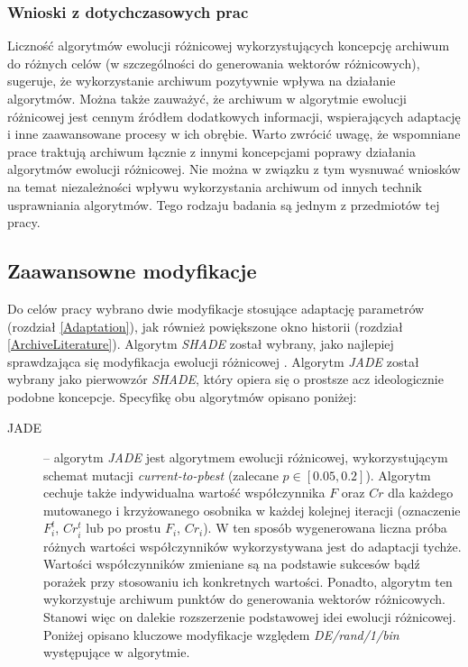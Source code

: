 \documentclass[12pt,a4paper]{report}
\begin{document}
{{{\subsubsection{Wnioski z dotychczasowych prac}
\par{
Liczność algorytmów ewolucji różnicowej wykorzystujących koncepcję archiwum do różnych celów (w szczególności do generowania wektorów różnicowych), sugeruje, że wykorzystanie archiwum pozytywnie wpływa na działanie algorytmów. Można także zauważyć, że archiwum w algorytmie ewolucji różnicowej jest cennym źródłem dodatkowych informacji, wspierających adaptację i inne zaawansowane procesy w ich obrębie. Warto zwrócić uwagę, że wspomniane prace traktują archiwum łącznie z innymi koncepcjami poprawy działania algorytmów ewolucji różnicowej. Nie można w związku z tym wysnuwać wniosków na temat niezależności wpływu wykorzystania archiwum od innych technik usprawniania algorytmów. Tego rodzaju badania są jednym z przedmiotów tej pracy.
}

\subsection{Zaawansowne modyfikacje}
\label{AdvancedDE}
\par{
Do celów pracy wybrano dwie modyfikacje stosujące adaptację parametrów (rozdział \ref{Adaptation}), jak również powiększone okno historii (rozdział \ref{ArchiveLiterature}). Algorytm \emph{SHADE} \cite{SHADE} został wybrany, jako najlepiej sprawdzająca się modyfikacja ewolucji różnicowej \cite{CEC2013Comp}. Algorytm \emph{JADE} \cite{JADE} został wybrany jako pierwowzór \emph{SHADE}, który opiera się o prostsze acz ideologicznie podobne koncepcje. Specyfikę obu algorytmów opisano poniżej:
}
\begin{description}
\item[JADE] \cite{JADE} -- algorytm \emph{JADE} jest algorytmem ewolucji różnicowej, wykorzystującym schemat mutacji \emph{current-to-pbest} (zalecane $p \in [0.05, 0.2]$). Algorytm cechuje także indywidualna wartość współczynnika $F$ oraz $Cr$ dla każdego mutowanego i krzyżowanego osobnika w każdej kolejnej iteracji (oznaczenie $F_i^t$, $Cr_i^t$ lub po prostu $F_i$, $Cr_i$). W ten sposób wygenerowana liczna próba różnych wartości współczynników wykorzystywana jest do adaptacji tychże. Wartości współczynników zmieniane są na podstawie sukcesów bądź porażek przy stosowaniu ich konkretnych wartości. Ponadto, algorytm ten wykorzystuje archiwum punktów do generowania wektorów różnicowych. Stanowi więc on dalekie rozszerzenie podstawowej idei ewolucji różnicowej. Poniżej opisano kluczowe modyfikacje względem \emph{DE/rand/1/bin} występujące w algorytmie.

\end{description}}}}
\end{document}
